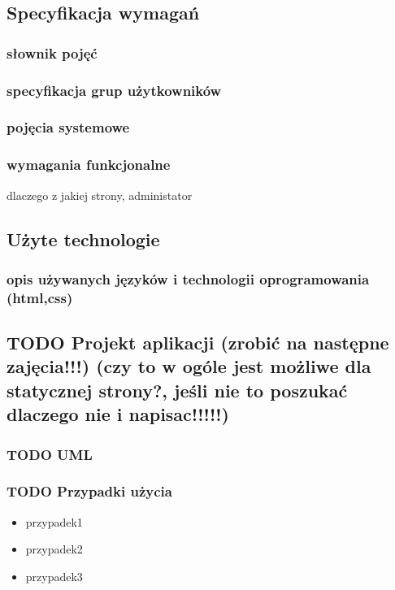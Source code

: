 \documentclass[11pt]{article}
\begin{document}
\subsection{Specyfikacja wymagań}
\label{sec:org38298f8}
\subsubsection{słownik pojęć}
\label{sec:org4e65413}
\subsubsection{specyfikacja grup użytkowników}
\label{sec:org8fb2c40}
\subsubsection{pojęcia systemowe}
\label{sec:orgef861b9}
\subsubsection{wymagania funkcjonalne}
\label{sec:org3937903}
dlaczego z jakiej strony, administator
\subsection{Użyte technologie}
\label{sec:org5d5410c}
\subsubsection{opis używanych języków i technologii oprogramowania (html,css)}
\label{sec:orgeb21466}
\subsection{{\bfseries\sffamily TODO} Projekt aplikacji (zrobić na następne zajęcia!!!) (czy to w ogóle jest możliwe dla statycznej strony?, jeśli nie to poszukać dlaczego nie i napisac!!!!!)}
\label{sec:org482ed28}
\subsubsection{{\bfseries\sffamily TODO} UML}
\label{sec:orgb4bf8c5}
\subsubsection{{\bfseries\sffamily TODO} Przypadki użycia}
\label{sec:org1c44285}
\begin{itemize}
\item przypadek1
\item przypadek2
\item przypadek3
\end{itemize}
\end{document}
